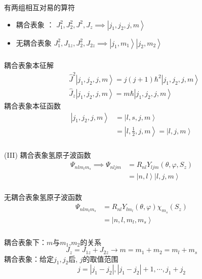 \begin{frame}[label=current]
  \frametitle{}
有两组相互对易的算符
\begin{itemize}
  \item 耦合表象 ： $J_1^2,J_2^2,J^2, J_z \implies \left\vert j_1, j_2, j, m \right\rangle $
  \item 无耦合表象 $J_1^2,J_{1z},J^2 _2, J_{2z} \implies \left\vert j_1, m_1\right\rangle \left\vert j_2, m_2 \right\rangle $
\end{itemize}
\end{frame} 

\begin{frame}[label=current]
  \frametitle{}
  耦合表象本征解
  \[ \begin{aligned}
    &\hat{J}^2  \left\vert j_1, j_2, j, m \right\rangle = j(j+1)\hbar^2 \left\vert j_1, j_2, j, m \right\rangle \\
    & \hat{J}_z  \left\vert j_1, j_2, j, m \right\rangle = m\hbar \left\vert j_1, j_2, j, m \right\rangle  
  \end{aligned} \]
  耦合表象本征函数
  \[ \begin{aligned}
    \left\vert j_1, j_2, j, m \right\rangle &= \left\vert l, s, j, m \right \rangle \\
    &=  \left\vert l, \frac{1}{2}, j, m \right \rangle = \left\vert l, j, m \right \rangle
  \end{aligned}\]
\end{frame}

\begin{frame}[label=current]
  \frametitle{}
 (III) 耦合表象氢原子波函数
  \[\begin{aligned}
    \Psi _{nlm_lm_s} \implies \Psi _{nljm} &=R_{nl}Y_{ljm}(\theta, \varphi , S_z) \\ 
    &= \left\vert n, l\right \rangle  \left\vert l, j, m \right \rangle
  \end{aligned}\]
  ~~\\ 
无耦合表象氢原子波函数
\[\begin{aligned}
  \Psi _{nlm_lm_s} &=R_{nl}Y_{lm_l}(\theta, \varphi) \chi _{m_s}(S_z) \\ 
  &= \left\vert n, l, m_l, m_s \right \rangle
\end{aligned}\]
\end{frame} 

\begin{frame}[label=current]
  \frametitle{}
  耦合表象下：$m$与$m_1$,$m_2$的关系
  \[J_z = J_{1z} + J_{2z} \to m= m_1 + m_2 = m_l + m_s\]
  耦合表象：给定$j_1, j_2$后, $j$的取值范围
  \[j = |j_1 - j_2|, |j_1 - j_2|+1, \cdots, j_1 + j_2 \]
\end{frame} 

